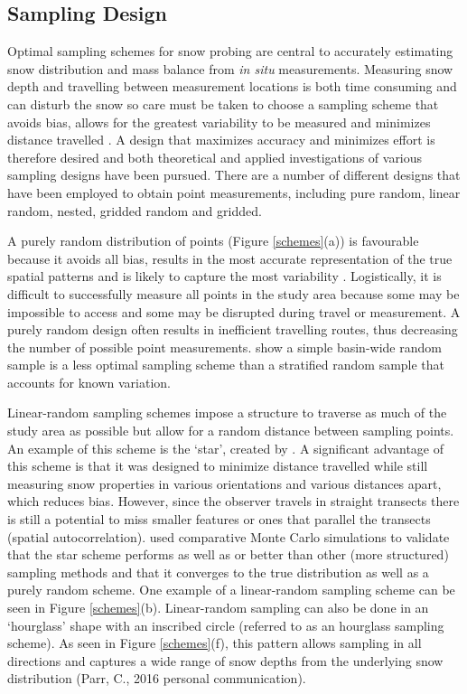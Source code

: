 \documentclass{sfuthesis}
\begin{document}
\subsection{Sampling Design}

Optimal sampling schemes for snow probing are central to accurately estimating snow distribution and mass balance from \textit{in situ} measurements. Measuring snow depth and travelling between measurement locations is both time consuming and can disturb the snow so care must be taken to choose a sampling scheme that avoids bias, allows for the greatest variability to be measured and minimizes distance travelled \citep{Shea2010}. A design that maximizes accuracy and minimizes effort is therefore desired \citep{Elder1991} and both theoretical \citep{Trujillo2015} and applied \citep{Kronholm2004,Shea2010} investigations of various sampling designs have been pursued. There are a number of different designs that have been employed to obtain point measurements, including pure random, linear random, nested, gridded random and gridded. 

A purely random distribution of points (Figure \ref{schemes}(a)) is favourable because it avoids all bias, results in the most accurate representation of the true spatial patterns and is likely to capture the most variability \citep{Kronholm2007, Shea2010}. Logistically, it is difficult to successfully measure all points in the study area because some may be impossible to access and some may be disrupted during travel or measurement. A purely random design often results in inefficient travelling routes, thus decreasing the number of possible point measurements. \cite{Elder1991} show a simple basin-wide random sample is a less optimal sampling scheme than a stratified random sample that accounts for known variation. 

Linear-random sampling schemes impose a structure to traverse as much of the study area as possible but allow for a random distance between sampling points. An example of this scheme is the `star', created by \cite{Shea2010}. A significant advantage of this scheme is that it was designed to minimize distance travelled while still measuring snow properties in various orientations and various distances apart, which reduces bias. However, since the observer travels in straight transects there is still a potential to miss smaller features or ones that parallel the transects (spatial autocorrelation). \cite{Shea2010} used comparative Monte Carlo simulations to validate that the star scheme performs as well as or better than other (more structured) sampling methods and that it converges to the true distribution as well as a purely random scheme. One example of a linear-random sampling scheme can be seen in Figure \ref{schemes}(b). Linear-random sampling can also be done in an `hourglass' shape with an inscribed circle (referred to as an hourglass sampling scheme). As seen in Figure \ref{schemes}(f), this pattern allows sampling in all directions and captures a wide range of snow depths from the underlying snow distribution (Parr, C., 2016 personal communication).
\end{document}
